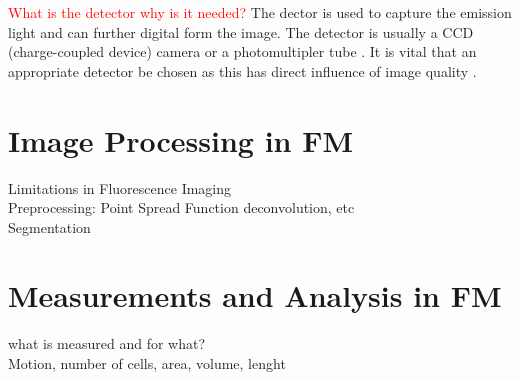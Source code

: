 
\begin{definition}[Detector]
	\textcolor{red}{What is the detector why is it needed?}
	The dector is used to capture the emission light and can further digital form the image.
	The detector is usually a CCD (charge-coupled device) camera or a photomultipler tube \citep{Danek2012,Hubeny2008,LichtmanConchello2005,Spring2003,Murphy2001}.
	It is vital that an appropriate detector be chosen as this has direct influence of image quality \citep{Fatima2008}.
\end{definition}


\section{Image Processing in FM}
\label{sec:ImageProcessingInFM}

Limitations in Fluorescence Imaging\\
Preprocessing: Point Spread Function deconvolution, etc\\
Segmentation 


\section{Measurements and Analysis in FM}
\label{sec:Measurements}

what is measured and for what?\\
Motion, number of cells, area, volume, lenght